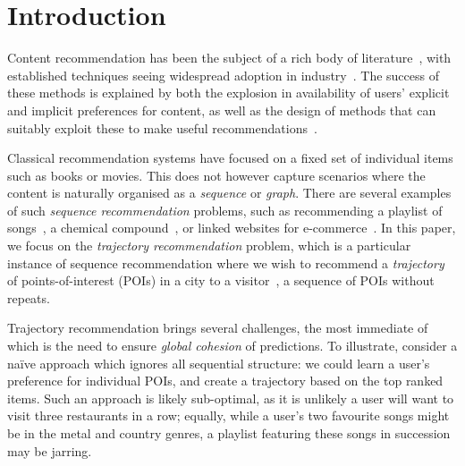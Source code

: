 
\section{Introduction}
\label{sec:intro}

Content recommendation has been the subject of a rich body of literature~\citep{Goldberg:1992,Sarwar:2001,Koren:2010},
with established techniques seeing widespread adoption in industry~\citep{Linden:2003,Agarwal:2013,Amatriain:2015,Gomez-Uribe:2015}.
The success of these methods is explained by both the explosion in availability of users' explicit and implicit preferences for content,
as well as the design of methods that can suitably exploit these to make useful recommendations~\citep{Koren:2009}.

Classical recommendation systems have focused on a fixed set of individual items such as books or movies.
This does not however capture scenarios where
the content %
is
naturally organised as a \emph{sequence} or {\em graph}.
There are several examples of such \emph{sequence recommendation} problems, such as
recommending
a playlist of songs~\citep{McFee:2011,chen2012playlist,hidasi2015session,choi2016towards},
a chemical compound~\cite{dehaspe1998finding},
or linked websites for e-commerce~\cite{antikacioglu2015recommendation}.
In this paper, we focus on the \emph{trajectory recommendation} problem,
which is a particular instance of sequence recommendation
where we wish to
recommend a \emph{trajectory} of points-of-interest (POIs) in a city to a visitor~\citep{lu2010photo2trip,lu2012personalized,ijcai15,cikm16paper},
\ie a sequence of POIs without repeats.



Trajectory recommendation brings several challenges,
the most immediate of which is the need to ensure \emph{global cohesion} of predictions.
To illustrate, consider a na\"{i}ve approach
which ignores all sequential structure:
we could learn a user's preference for individual POIs,
and create a trajectory based on the top ranked items.
Such an approach is likely sub-optimal,
as
it is unlikely \eg a user will want to visit three restaurants in a row;
equally,
while a user's two favourite songs might be in
the metal and country genres,
a playlist featuring these songs in succession may be jarring.

